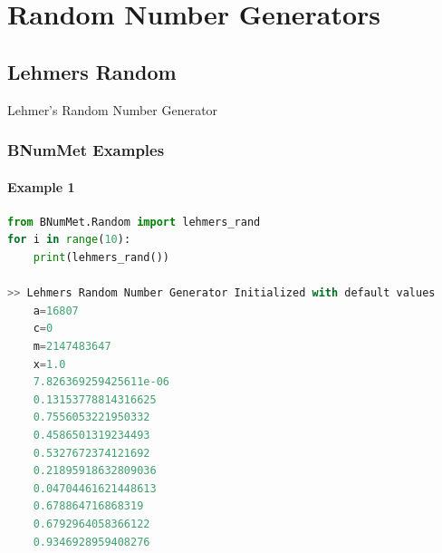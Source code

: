 \section{Random Number Generators}
\subsection{Lehmers Random}
\begin{algorithm}[H]
\SetAlgoLined
{}
\caption{Lehmer's Random Number Generator}
\label{alg:lehmersrand}
\end{algorithm}
\subsubsection{BNumMet Examples}
\paragraph{Example 1}{
\begin{lstlisting}[language=Python]
from BNumMet.Random import lehmers_rand
for i in range(10):
    print(lehmers_rand())

>> Lehmers Random Number Generator Initialized with default values
	a=16807
	c=0
	m=2147483647
	x=1.0
    7.826369259425611e-06
    0.13153778814316625
    0.7556053221950332
    0.4586501319234493
    0.5327672374121692
    0.21895918632809036
    0.04704461621448613
    0.678864716868319
    0.6792964058366122
    0.9346928959408276
\end{lstlisting}
}
